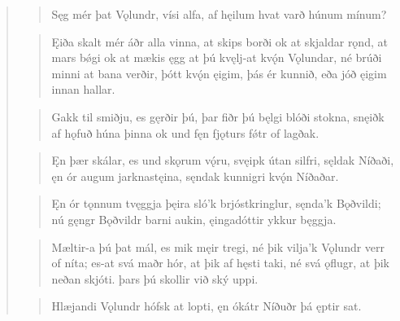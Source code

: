 \begin{verse}

\begin{verse}
\bva Sęg mér þat Vǫlundr, \hld vísi alfa,
af hęilum hvat varð \hld húnum mínum? \\%
\end{verse}


\begin{verse}
\bva Ęiða skalt mér áðr \hld alla vinna,
at skips borði \hld ok at skjaldar rǫnd,
at mars bǿgi \hld ok at mækis ęgg
at þú kvęlj-at \hld kvǫ́n Vǫlundar,
né brúði minni \hld at bana verðir,
þótt kvǫ́n ęigim, \hld þás ér kunnið,
eða jóð ęigim \hld innan hallar. \\%
\end{verse}


\begin{verse}
\bva Gakk til smiðju, \hld es gęrðir þú,
þar fiðr þú bęlgi \hld blóði stokna,
snęiðk af hǫfuð \hld húna þinna
ok und fęn fjǫturs \hld fǿtr of lagðak. \\%
\end{verse}


\begin{verse}
\bva Ęn þær skálar, \hld es und skǫrum vǫ́ru,
svęipk útan silfri, \hld sęldak Níðaði,
ęn ór augum \hld jarknastęina,
sęndak kunnigri \hld kvǫ́n Níðaðar. \\%
\end{verse}


\begin{verse}
\bva Ęn ór tǫnnum \hld tvęggja þęira
sló'k brjóstkringlur, \hld sęnda'k Bǫðvildi;
nú gęngr Bǫðvildr \hld barni aukin,
ęingadóttir \hld ykkur bęggja. \\%
\end{verse}


\begin{verse}
\bva Mæltir-a þú þat mál, \hld es mik męir tregi,
né þik vilja'k Vǫlundr \hld verr of níta;
es-at svá maðr hór, \hld at þik af hęsti taki,
né svá ǫflugr, \hld at þik neðan skjóti.
þars þú skollir \hld við ský uppi. \\%
\end{verse}


\begin{verse}
\bva Hlæjandi Vǫlundr \hld hófsk at lopti,
ęn ókátr Níðuðr \hld þá ęptir sat. \\%
\end{verse}


\end{verse}
